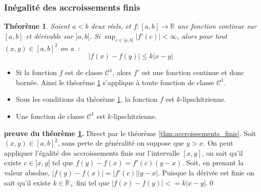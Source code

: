 \documentclass[10pt,notheorems]{beamer}
\theoremstyle{plain}
\newtheorem{theorem}{Théorème}
\theoremstyle{definition} %
\begin{document}
\begin{frame}
  \frametitle{Inégalité des accroissements finis}
  \hypertarget{slide_inegalite_accroissements_finis_1}{}

  \begin{theorem}\label{thm:inegalite_accroissements_finis}
    Soient $a<b$ deux réels, et $f: [a,b]\rightarrow \mathbb R$ une fonction continue sur $[a, b]$ et dérivable sur $]a, b[$. Si $\sup_{c\in]a,b[}|f'(c)|<\infty$, alors pour tout $(x,y)\in[a,b]^2$ on a~:
    \[
      |f(x)-f(y)| \leq k |x-y|
    \]
  \end{theorem}

  \bigskip

  \begin{itemize}

  \item Si la fonction $f$ est de classe $\mathcal C^1$, alors $f'$ est une fonction continue et donc bornée. Ainsi le théorème \hyperlink{slide_inegalite_accroissements_finis_1}{\ref{thm:inegalite_accroissements_finis}} s'applique à toute fonction de classe $\mathcal C^1$.\newline

  \item Sous les conditions du théorème \hyperlink{slide_inegalite_accroissements_finis_1}{\ref{thm:inegalite_accroissements_finis}}, la fonction $f$ est $k$-lipschitzienne.\newline

  \item Une fonction de classe $\mathcal C^1$ est $k$-lipschitzienne.

  \end{itemize}

\end{frame}


\begin{notes}
  \textbf{preuve du théorème \hyperlink{slide_inegalite_accroissements_finis_1}{\ref{thm:inegalite_accroissements_finis}}.} Direct par le théorème \hyperlink{slide_accroissements_finis_1}{\ref{thm:accroissements_finis}}. Soit $(x,y)\in[a,b]^2$, sans perte de généralité on suppose que $y>x$. On peut appliquer l’égalité des accroissements finis sur l'intervalle $[x, y]$, on sait qu'il existe $c\in]x, y[$ tel que $f(y)-f(x) = f'(c)(y-x)$. Soit, en prenant la valeur absolue, $|f(y)-f(x)| = |f'(c)||y-x|$. Puisque la dérivée est finie on sait qu'il existe $k\in\mathbb R_+$ fini tel que $|f(x)-f(y)|<=k|x-y|$.\qed

\end{notes}
\end{document}
